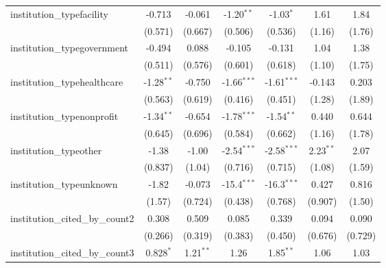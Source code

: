 \begin{tabular}{lcccccc}
   institution\_typefacility             & -0.713        & -0.061        & -1.20$^{**}$  & -1.03$^{*}$   & 1.61          & 1.84\\   
                                         & (0.571)       & (0.667)       & (0.506)       & (0.536)       & (1.16)        & (1.76)\\   
   institution\_typegovernment           & -0.494        & 0.088         & -0.105        & -0.131        & 1.04          & 1.38\\   
                                         & (0.511)       & (0.576)       & (0.601)       & (0.618)       & (1.10)        & (1.75)\\   
   institution\_typehealthcare           & -1.28$^{**}$  & -0.750        & -1.66$^{***}$ & -1.61$^{***}$ & -0.143        & 0.203\\   
                                         & (0.563)       & (0.619)       & (0.416)       & (0.451)       & (1.28)        & (1.89)\\   
   institution\_typenonprofit            & -1.34$^{**}$  & -0.654        & -1.78$^{***}$ & -1.54$^{**}$  & 0.440         & 0.644\\   
                                         & (0.645)       & (0.696)       & (0.584)       & (0.662)       & (1.16)        & (1.78)\\   
   institution\_typeother                & -1.38         & -1.00         & -2.54$^{***}$ & -2.58$^{***}$ & 2.23$^{**}$   & 2.07\\   
                                         & (0.837)       & (1.04)        & (0.716)       & (0.715)       & (1.08)        & (1.59)\\   
   institution\_typeunknown              & -1.82         & -0.073        & -15.4$^{***}$ & -16.3$^{***}$ & 0.427         & 0.816\\   
                                         & (1.57)        & (0.724)       & (0.438)       & (0.768)       & (0.907)       & (1.50)\\   
   institution\_cited\_by\_count2        & 0.308         & 0.509         & 0.085         & 0.339         & 0.094         & 0.090\\   
                                         & (0.266)       & (0.319)       & (0.383)       & (0.450)       & (0.676)       & (0.729)\\   
   institution\_cited\_by\_count3        & 0.828$^{*}$   & 1.21$^{**}$   & 1.26          & 1.85$^{**}$   & 1.06          & 1.03\\   

\end{tabular}
